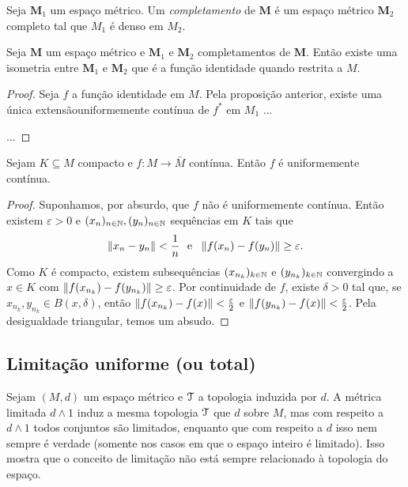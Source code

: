 \begin{definition}
Seja $\bm M_1$  um espaço métrico. Um \emph{completamento} de $\bm M$ é um espaço métrico $\bm M_2$ completo tal que $M_1$ é denso em $M_2$.
\end{definition}

\begin{proposition}
Seja $\bm M$ um espaço métrico e $\bm M_1$ e $\bm M_2$ completamentos de $\bm M$. Então existe uma isometria entre $\bm M_1$ e $\bm M_2$ que é a função identidade quando restrita a $M$.
\end{proposition}
\begin{proof}
	Seja $f$ a função identidade em $M$. Pela proposição anterior, existe uma única extensãouniformemente contínua de $f^*$ em $M_1$ ...
	
	...
\end{proof}


\begin{proposition}
Sejam $K \subseteq M$ compacto e $f: M \to \bar M$ contínua. Então $f$ é uniformemente contínua.
\end{proposition}
\begin{proof}
Suponhamos, por absurdo, que $f$ não é uniformemente contínua. Então existem $\varepsilon > 0$ e $(x_n)_{n \in \mathbb{N}},(y_n)_{n \in \mathbb{N}}$ sequências em $K$ tais que
	\begin{equation*}
	\left\Vert{x_n - y_n}\right\Vert < \frac{1}{n} \text{\ \ e\ \ } \left\Vert{f(x_n)-f(y_n)}\right\Vert \geq \varepsilon.
	\end{equation*}
Como $K$ é compacto, existem subsequências $(x_{n_k})_{k \in \mathbb{N}}$  e $(y_{n_k})_{k \in \mathbb{N}}$ convergindo a $x \in K$ com $\left\Vert{f(x_{n_k})-f(y_{n_k})}\right\Vert \geq \varepsilon$. Por continuidade de $f$, existe $\delta > 0$ tal que, se $x_{n_k},y_{n_k} \in B(x,\delta)$, então $\left\Vert{f(x_{n_k})-f(x)}\right\Vert < \frac{\varepsilon}{2}$ e $\left\Vert{f(y_{n_k})-f(x)}\right\Vert < \frac{\varepsilon}{2}$. Pela desigualdade triangular, temos um absudo.
\end{proof}


\subsection{Limitação uniforme (ou total)}

Sejam $(M,d)$ um espaço métrico e $\mathcal{T}$ a topologia induzida por $d$. A métrica limitada $d \wedge 1$ induz a mesma topologia $\mathcal{T}$ que $d$ sobre $M$, mas com respeito a $d \wedge 1$ todos conjuntos são limitados, enquanto que com respeito a $d$ isso nem sempre é verdade (somente nos casos em que o espaço inteiro é limitado). Isso mostra que o conceito de limitação não está sempre relacionado à topologia do espaço.

